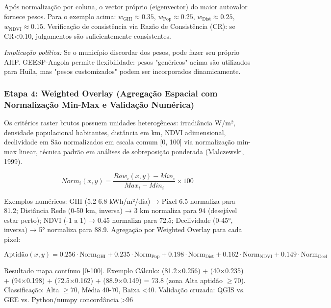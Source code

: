 \documentclass[12pt, a4paper]{article}
\begin{document}
Após normalização por coluna, o vector próprio (eigenvector) do maior autovalor fornece pesos. Para o exemplo acima: $w_{\text{GHI}} \approx 0.35$, $w_{\text{Pop}} \approx 0.25$, $w_{\text{Dist}} \approx 0.25$, $w_{\text{NDVI}} \approx 0.15$. Verificação de consistência via Razão de Consistência (CR): se CR<0.10, julgamentos são suficientemente consistentes.

\textit{Implicação política:} Se o município discordar dos pesos, pode fazer seu próprio AHP.
GEESP-Angola permite flexibilidade: pesos "genéricos" acima são utilizados para Huíla, mas "pesos customizados" podem ser incorporados dinamicamente.

\subsubsection{Etapa 4: Weighted Overlay (Agregação Espacial com Normalização Min-Max e Validação Numérica)}

Os critérios raster brutos possuem unidades heterogêneas: irradiância W/m², densidade populacional habitantes, distância em km, NDVI adimensional, declividade em %
São normalizados em escala comum [0, 100] via normalização min-max linear, técnica padrão em análises de sobreposição ponderada (Malczewski, 1999).

\begin{equation}
Norm_i(x,y) = \frac{Raw_i(x,y) - Min_i}{Max_i - Min_i} \times 100
\end{equation}

Exemplos numéricos: GHI (5.2-6.8 kWh/m²/dia) → Pixel 6.5 normaliza para 81.2; Distância Rede (0-50 km, inversa) → 3 km normaliza para 94 (desejável estar perto); NDVI (-1 a 1) → 0.45 normaliza para 72.5; Declividade (0-45°, inversa) → 5° normaliza para 88.9. Agregação por Weighted Overlay para cada pixel:

\begin{equation}
\text{Aptidão}(x,y) = 0.256 \cdot \text{Norm}_{\text{GHI}} + 0.235 \cdot \text{Norm}_{\text{Pop}} + 0.198 \cdot \text{Norm}_{\text{Dist}} + 0.162 \cdot \text{Norm}_{\text{NDVI}} + 0.149 \cdot \text{Norm}_{\text{Decl}}
\end{equation}

Resultado mapa contínuo [0-100]. Exemplo Cálculo: (81.2×0.256) + (40×0.235) + (94×0.198) + (72.5×0.162) + (88.9×0.149) = 73.8 (zona Alta aptidão $\geq$70). Classificação: Alta $\geq$70, Média 40-70, Baixa <40. Validação cruzada: QGIS vs. GEE vs. Python/numpy concordância >96%
\end{document}
